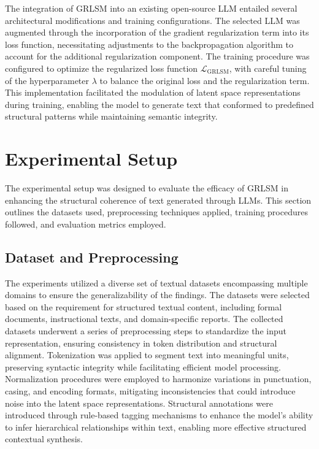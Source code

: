 \documentclass{article}
\begin{document}
The integration of GRLSM into an existing open-source LLM entailed several architectural modifications and training configurations. The selected LLM was augmented through the incorporation of the gradient regularization term into its loss function, necessitating adjustments to the backpropagation algorithm to account for the additional regularization component. The training procedure was configured to optimize the regularized loss function \( \mathcal{L}_{\text{GRLSM}} \), with careful tuning of the hyperparameter \( \lambda \) to balance the original loss and the regularization term. This implementation facilitated the modulation of latent space representations during training, enabling the model to generate text that conformed to predefined structural patterns while maintaining semantic integrity.

\section{Experimental Setup}

The experimental setup was designed to evaluate the efficacy of GRLSM in enhancing the structural coherence of text generated through LLMs. This section outlines the datasets used, preprocessing techniques applied, training procedures followed, and evaluation metrics employed.

\subsection{Dataset and Preprocessing}

The experiments utilized a diverse set of textual datasets encompassing multiple domains to ensure the generalizability of the findings. The datasets were selected based on the requirement for structured textual content, including formal documents, instructional texts, and domain-specific reports. The collected datasets underwent a series of preprocessing steps to standardize the input representation, ensuring consistency in token distribution and structural alignment. Tokenization was applied to segment text into meaningful units, preserving syntactic integrity while facilitating efficient model processing. Normalization procedures were employed to harmonize variations in punctuation, casing, and encoding formats, mitigating inconsistencies that could introduce noise into the latent space representations. Structural annotations were introduced through rule-based tagging mechanisms to enhance the model's ability to infer hierarchical relationships within text, enabling more effective structured contextual synthesis.
\end{document}

